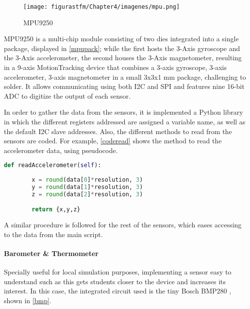 \begin{figure} [H]
			\centering
			\texttt{[image: figurastfm/Chapter4/imagenes/mpu.png]}
			\caption{MPU9250} \label{mpupack}
			\vspace{-0.5cm}
\end{figure}


MPU9250  is a multi-chip module consisting of two dies integrated into a single package, displayed in \autoref{mpupack}; while the first hosts the 3-Axis gyroscope and the 3-Axis accelerometer, the second houses the 3-Axis magnetometer, resulting in a 9-axis MotionTracking
device that combines a 3-axis gyroscope, 3-axis accelerometer, 3-axis magnetometer in a small 3x3x1 mm package, challenging to solder. It allows communicating using both \acrshort{I2C} and \acrshort{SPI} and features nine 16-bit \acrshort{ADC} to digitize the output of each sensor.

In order to gather the data from the sensors, it is implemented a Python library in which the different registers addressed are assigned a variable name, as well as the default \acrshort{I2C} slave addresses. Also, the different methods to read from the sensors are coded. For example, \autoref{coderead} shows the method to read the accelerometer data, using pseudocode.

\begin{lstlisting}[language=Python, caption=Method to read from the accelerometer sensors, label=coderead]
    def readAccelerometer(self):
 
        x = round(data[0]*resolution, 3)
        y = round(data[1]*resolution, 3)
        z = round(data[2]*resolution, 3)

        return {x,y,z}
\end{lstlisting}

A similar procedure is followed for the rest of the sensors, which eases accessing to the data from the main script.


\paragraph{Barometer \& Thermometer}

Specially useful for local simulation purposes, implementing a sensor easy to understand such as this gets students closer to the device and increases its interest. In this case, the integrated circuit used is the tiny Bosch BMP280 \cite{bosch}, shown in \autoref{bmp}.

